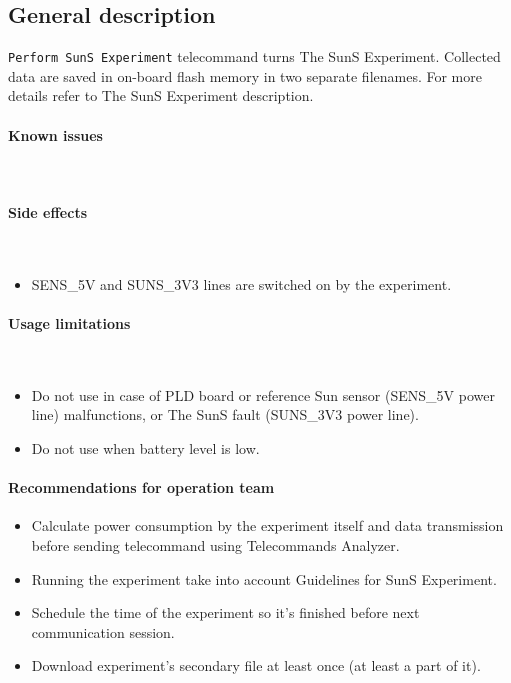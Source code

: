 

\subsection{General description}
\texttt{Perform SunS Experiment} telecommand turns The SunS Experiment. Collected data are saved in on-board flash memory in two separate filenames. For more details refer to The SunS Experiment description.

\paragraph{Known issues} \mbox{} \\
\None

\paragraph{Side effects} \mbox{} \\
\begin{itemize}
    \item SENS_5V and SUNS_3V3 lines are switched on by the experiment.
\end{itemize}


\paragraph{Usage limitations} \mbox{} \\
\begin{itemize}
    \item Do not use in case of PLD board or reference Sun sensor (SENS_5V power line) malfunctions, or The SunS fault (SUNS_3V3 power line).
    \item Do not use when battery level is low.
\end{itemize}

\paragraph{Recommendations for operation team}
\begin{itemize}
    \item Calculate power consumption by the experiment itself and data transmission before sending telecommand using Telecommands Analyzer.
    \item Running the experiment take into account Guidelines for SunS Experiment.
    \item Schedule the time of the experiment so it's finished before next communication session.
    \item Download experiment's secondary file at least once (at least a part of it).
\end{itemize}

